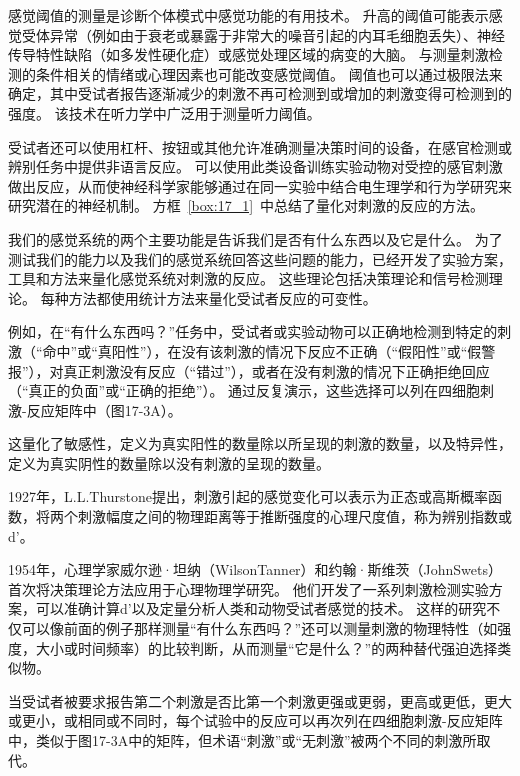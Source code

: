 感觉阈值的测量是诊断个体模式中感觉功能的有用技术。 
升高的阈值可能表示感觉受体异常（例如由于衰老或暴露于非常大的噪音引起的内耳毛细胞丢失）、神经传导特性缺陷（如多发性硬化症）或感觉处理区域的病变的大脑。
与测量刺激检测的条件相关的情绪或心理因素也可能改变感觉阈值。
阈值也可以通过极限法来确定，其中受试者报告逐渐减少的刺激不再可检测到或增加的刺激变得可检测到的强度。
该技术在听力学中广泛用于测量听力阈值。


受试者还可以使用杠杆、按钮或其他允许准确测量决策时间的设备，在感官检测或辨别任务中提供非语言反应。 
可以使用此类设备训练实验动物对受控的感官刺激做出反应，从而使神经科学家能够通过在同一实验中结合电生理学和行为学研究来研究潜在的神经机制。
方框~\ref{box:17_1}~中总结了量化对刺激的反应的方法。


\begin{proposition} \label{box:17_1}
	
	\quad \quad 我们的感觉系统的两个主要功能是告诉我们是否有什么东西以及它是什么。
	为了测试我们的能力以及我们的感觉系统回答这些问题的能力，已经开发了实验方案，工具和方法来量化感觉系统对刺激的反应。
	这些理论包括决策理论和信号检测理论。
	每种方法都使用统计方法来量化受试者反应的可变性。
	
	\quad \quad 例如，在“有什么东西吗？”任务中，受试者或实验动物可以正确地检测到特定的刺激（“命中”或“真阳性”），在没有该刺激的情况下反应不正确（“假阳性”或“假警报”），对真正刺激没有反应（“错过”），或者在没有刺激的情况下正确拒绝回应（“真正的负面”或“正确的拒绝”）。
	通过反复演示，这些选择可以列在四细胞刺激-反应矩阵中（图17-3A）。
	
	\quad \quad 这量化了敏感性，定义为真实阳性的数量除以所呈现的刺激的数量，以及特异性，定义为真实阴性的数量除以没有刺激的呈现的数量。
	
	\quad \quad 1927年，L.L.Thurstone提出，刺激引起的感觉变化可以表示为正态或高斯概率函数，将两个刺激幅度之间的物理距离等于推断强度的心理尺度值，称为辨别指数或d'。
	
	\quad \quad 1954年，心理学家威尔逊·坦纳（WilsonTanner）和约翰·斯维茨（JohnSwets）首次将决策理论方法应用于心理物理学研究。
	他们开发了一系列刺激检测实验方案，可以准确计算d'以及定量分析人类和动物受试者感觉的技术。
	这样的研究不仅可以像前面的例子那样测量“有什么东西吗？”还可以测量刺激的物理特性（如强度，大小或时间频率）的比较判断，从而测量“它是什么？”的两种替代强迫选择类似物。
	
	\quad \quad 当受试者被要求报告第二个刺激是否比第一个刺激更强或更弱，更高或更低，更大或更小，或相同或不同时，每个试验中的反应可以再次列在四细胞刺激-反应矩阵中，类似于图17-3A中的矩阵，但术语“刺激”或“无刺激”被两个不同的刺激所取代。
	

\end{proposition}
